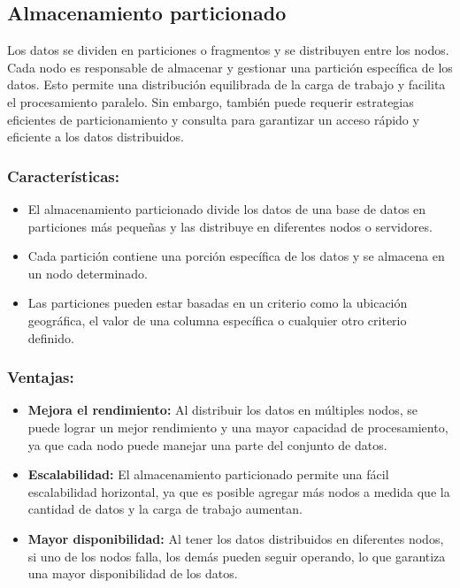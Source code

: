 \subsection{Almacenamiento particionado}
\noindent
Los datos se dividen en particiones o fragmentos y se distribuyen entre los nodos. Cada nodo es responsable de almacenar y gestionar una partición específica de los datos. Esto permite una distribución equilibrada de la carga de trabajo y facilita el procesamiento paralelo. Sin embargo, también puede requerir estrategias eficientes de particionamiento y consulta para garantizar un acceso rápido y eficiente a los datos distribuidos.

\subsubsection{Características:}
\noindent
\begin{itemize}
	\item El almacenamiento particionado divide los datos de una base de datos en particiones más pequeñas y las distribuye en diferentes nodos o servidores.
	\item Cada partición contiene una porción específica de los datos y se almacena en un nodo determinado.
	\item Las particiones pueden estar basadas en un criterio como la ubicación geográfica, el valor de una columna específica o cualquier otro criterio definido.
\end{itemize}

\subsubsection{Ventajas:}
\noindent
\begin{itemize}
	\item \textbf{Mejora el rendimiento:} Al distribuir los datos en múltiples nodos, se puede lograr un mejor rendimiento y una mayor capacidad de procesamiento, ya que cada nodo puede manejar una parte del conjunto de datos.
	\item \textbf{Escalabilidad:} El almacenamiento particionado permite una fácil escalabilidad horizontal, ya que es posible agregar más nodos a medida que la cantidad de datos y la carga de trabajo aumentan.
	\item \textbf{Mayor disponibilidad:} Al tener los datos distribuidos en diferentes nodos, si uno de los nodos falla, los demás pueden seguir operando, lo que garantiza una mayor disponibilidad de los datos.
\end{itemize}


